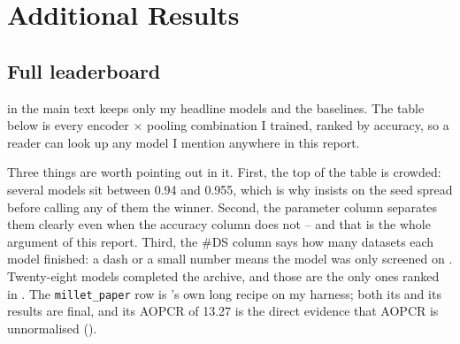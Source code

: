 %

\section{Additional Results}
\label{app:additional}

\subsection{Full leaderboard}
\label{app:leaderboard}

 in the main text keeps only my headline models and the baselines. The table
below is every encoder $\times$ pooling combination I trained, ranked by \webtraffic{} accuracy, so
a reader can look up any model I mention anywhere in this report.

%
\clearpage
{\let\small\tiny
 \setlength{\tabcolsep}{1.2pt}
 }

Three things are worth pointing out in it. First, the top of the table is crowded: several models
sit between 0.94 and 0.955, which is why  insists on the seed spread before
calling any of them the winner. Second, the parameter column separates them clearly even when the
accuracy column does not -- and that is the whole argument of this report. Third, the \#DS column
says how many \ucr{} datasets each model finished: a dash or a small number means the model was only
screened on \webtraffic{}. Twenty-eight models completed the archive, and those are the only ones
ranked in . The \texttt{millet\_paper} row is \millet{}'s own long recipe on
my harness; both its \webtraffic{} and its \ucr{} results are final, and its AOPCR of 13.27 is the
direct evidence that AOPCR is unnormalised ().

